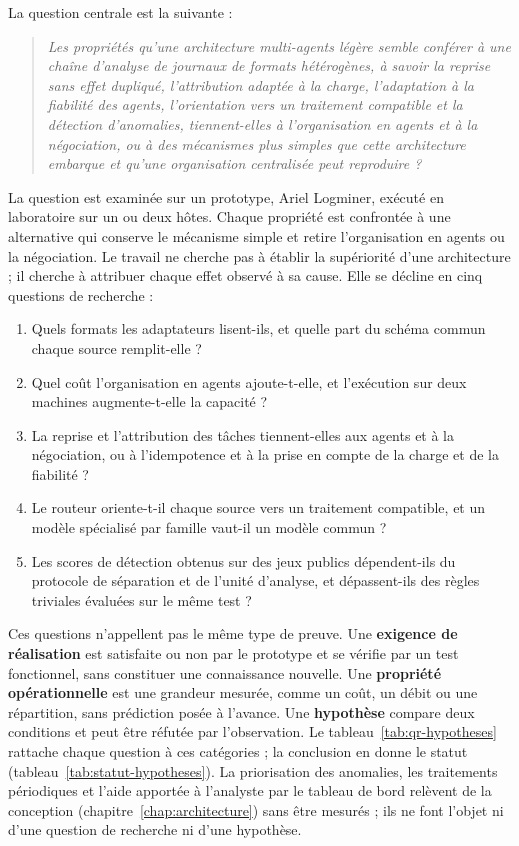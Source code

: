 La question centrale est la suivante :

\begin{quote}
\textit{Les propriétés qu'une architecture multi-agents légère semble conférer à une chaîne d'analyse de journaux de formats hétérogènes, à savoir la reprise sans effet dupliqué, l'attribution adaptée à la charge, l'adaptation à la fiabilité des agents, l'orientation vers un traitement compatible et la détection d'anomalies, tiennent-elles à l'organisation en agents et à la négociation, ou à des mécanismes plus simples que cette architecture embarque et qu'une organisation centralisée peut reproduire ?}
\end{quote}

La question est examinée sur un prototype, Ariel Logminer, exécuté en laboratoire sur un ou deux hôtes. Chaque propriété est confrontée à une alternative qui conserve le mécanisme simple et retire l'organisation en agents ou la négociation. Le travail ne cherche pas à établir la supériorité d'une architecture ; il cherche à attribuer chaque effet observé à sa cause. Elle se décline en cinq questions de recherche :

\begin{enumerate}[label=\textbf{QR\arabic*.}, leftmargin=1.6cm]
    \item Quels formats les adaptateurs lisent-ils, et quelle part du schéma commun chaque source remplit-elle ?
    \item Quel coût l'organisation en agents ajoute-t-elle, et l'exécution sur deux machines augmente-t-elle la capacité ?
    \item La reprise et l'attribution des tâches tiennent-elles aux agents et à la négociation, ou à l'idempotence et à la prise en compte de la charge et de la fiabilité ?
    \item Le routeur oriente-t-il chaque source vers un traitement compatible, et un modèle spécialisé par famille vaut-il un modèle commun ?
    \item Les scores de détection obtenus sur des jeux publics dépendent-ils du protocole de séparation et de l'unité d'analyse, et dépassent-ils des règles triviales évaluées sur le même test ?
\end{enumerate}

Ces questions n'appellent pas le même type de preuve. Une \textbf{exigence de réalisation} est satisfaite ou non par le prototype et se vérifie par un test fonctionnel, sans constituer une connaissance nouvelle. Une \textbf{propriété opérationnelle} est une grandeur mesurée, comme un coût, un débit ou une répartition, sans prédiction posée à l'avance. Une \textbf{hypothèse} compare deux conditions et peut être réfutée par l'observation. Le tableau~\ref{tab:qr-hypotheses} rattache chaque question à ces catégories ; la conclusion en donne le statut (tableau~\ref{tab:statut-hypotheses}). La priorisation des anomalies, les traitements périodiques et l'aide apportée à l'analyste par le tableau de bord relèvent de la conception (chapitre~\ref{chap:architecture}) sans être mesurés ; ils ne font l'objet ni d'une question de recherche ni d'une hypothèse.

